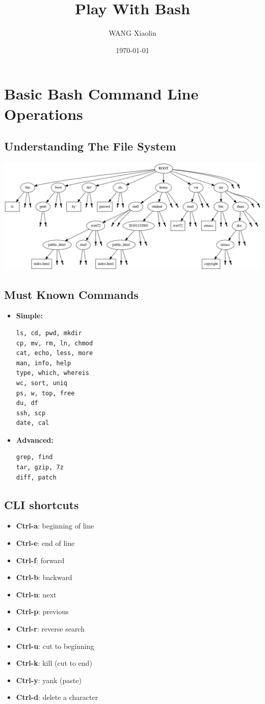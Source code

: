 \documentclass[12pt]{article}
\author{WANG Xiaolin}
\date{\today}
\title{Play With Bash}
\begin{document}
\maketitle
\tableofcontents


\section{Basic Bash Command Line Operations}
\label{sec-1}
\subsection{Understanding The File System}
\label{sec-1-1}

\includegraphics[width=.6\linewidth]{./cs2.png}

\subsection{Must Known Commands}
\label{sec-1-2}
\begin{itemize}
\item \textbf{Simple:}
\begin{verbatim}
ls, cd, pwd, mkdir
cp, mv, rm, ln, chmod
cat, echo, less, more
man, info, help
type, which, whereis
wc, sort, uniq
ps, w, top, free
du, df
ssh, scp
date, cal
\end{verbatim}
\item \textbf{Advanced:}
\begin{verbatim}
grep, find
tar, gzip, 7z 
diff, patch
\end{verbatim}
\end{itemize}
\subsection{CLI shortcuts}
\label{sec-1-3}
\begin{itemize}
\item \textbf{Ctrl-a}: beginning of line
\item \textbf{Ctrl-e}: end of line
\item \textbf{Ctrl-f}: forward
\item \textbf{Ctrl-b}: backward
\item \textbf{Ctrl-n}: next
\item \textbf{Ctrl-p}: previous
\item \textbf{Ctrl-r}: reverse search
\item \textbf{Ctrl-u}: cut to beginning
\item \textbf{Ctrl-k}: kill (cut to end)
\item \textbf{Ctrl-y}: yank (paste)
\item \textbf{Ctrl-d}: delete a character
\end{itemize}
\end{document}
